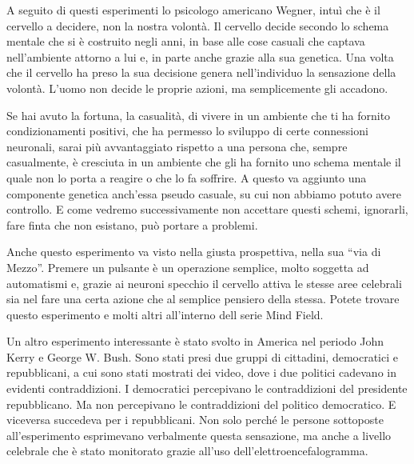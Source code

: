 \documentclass[12pt]{book} %
\begin{document}
\bigskip

A seguito di questi esperimenti lo psicologo americano Wegner, intuì che è il cervello a decidere, non la nostra
volontà. Il cervello decide secondo lo schema mentale che si è costruito negli anni, in base alle cose casuali che
captava nell'ambiente attorno a lui e, in parte anche grazie alla sua genetica. Una volta che il
cervello ha preso la sua decisione genera nell'individuo la sensazione della volontà.
L'uomo non decide le proprie azioni, ma semplicemente gli accadono.

Se hai avuto la fortuna, la casualità, di vivere in un ambiente che ti ha fornito condizionamenti positivi, che ha
permesso lo sviluppo di certe connessioni neuronali, sarai più avvantaggiato rispetto a una persona che, sempre
casualmente, è cresciuta in un ambiente che gli ha fornito uno schema mentale il quale non lo porta a reagire o che lo
fa soffrire. A questo va aggiunto una componente genetica anch'essa pseudo casuale, su cui non
abbiamo potuto avere controllo. E come vedremo successivamente non accettare questi schemi, ignorarli, fare finta che
non esistano, può portare a problemi.

Anche questo esperimento va visto nella giusta prospettiva, nella sua “via di Mezzo”. Premere un pulsante è un
operazione semplice, molto soggetta ad automatismi e, grazie ai neuroni specchio il cervello attiva le stesse aree
celebrali sia nel fare una certa azione che al semplice pensiero della stessa. Potete trovare questo esperimento e
molti altri all'interno dell serie Mind
Field.

Un altro esperimento interessante è stato svolto in America nel periodo John Kerry e George W. Bush. Sono stati presi
due gruppi di cittadini, democratici e repubblicani, a cui sono stati mostrati dei video, dove i due politici cadevano
in evidenti contraddizioni. I democratici percepivano le contraddizioni del presidente repubblicano. Ma non percepivano
le contraddizioni del politico democratico. E viceversa succedeva per i repubblicani. Non solo perché le persone
sottoposte all'esperimento esprimevano verbalmente questa sensazione, ma anche a livello celebrale
che è stato monitorato grazie all'uso dell'elettroencefalogramma.
\end{document}
